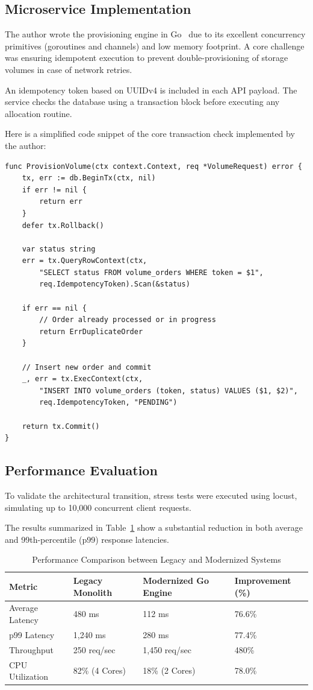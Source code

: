 \subsection{Microservice Implementation}
The author wrote the provisioning engine in Go~\cite{donovan2015goprogramming} due to its excellent concurrency primitives (goroutines and channels) and low memory footprint. A core challenge was ensuring idempotent execution to prevent double-provisioning of storage volumes in case of network retries.

An idempotency token based on UUIDv4 is included in each API payload. The service checks the database using a transaction block before executing any allocation routine.

Here is a simplified code snippet of the core transaction check implemented by the author:

\begin{verbatim}
func ProvisionVolume(ctx context.Context, req *VolumeRequest) error {
    tx, err := db.BeginTx(ctx, nil)
    if err != nil {
        return err
    }
    defer tx.Rollback()

    var status string
    err = tx.QueryRowContext(ctx, 
        "SELECT status FROM volume_orders WHERE token = $1", 
        req.IdempotencyToken).Scan(&status)
    
    if err == nil {
        // Order already processed or in progress
        return ErrDuplicateOrder
    }
    
    // Insert new order and commit
    _, err = tx.ExecContext(ctx, 
        "INSERT INTO volume_orders (token, status) VALUES ($1, $2)", 
        req.IdempotencyToken, "PENDING")
    
    return tx.Commit()
}
\end{verbatim}

\subsection{Performance Evaluation}
To validate the architectural transition, stress tests were executed using locust, simulating up to 10,000 concurrent client requests.

The results summarized in Table~\ref{tab:perf_metrics} show a substantial reduction in both average and 99th-percentile (p99) response latencies.

\begin{table}[htbp]
\centering
\caption{Performance Comparison between Legacy and Modernized Systems}
\label{tab:perf_metrics}
\begin{tabularx}{\textwidth}{lXXX}
\toprule
\textbf{Metric} & \textbf{Legacy Monolith} & \textbf{Modernized Go Engine} & \textbf{Improvement (\%)} \\
\midrule
Average Latency & 480 ms & 112 ms & 76.6\% \\
p99 Latency     & 1,240 ms & 280 ms & 77.4\% \\
Throughput      & 250 req/sec & 1,450 req/sec & 480\% \\
CPU Utilization & 82\% (4 Cores) & 18\% (2 Cores) & 78.0\% \\
\bottomrule
\end{tabularx}
\end{table}
